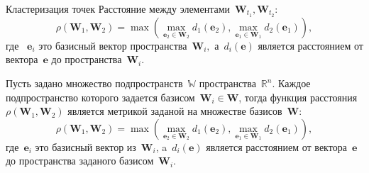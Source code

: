 \documentclass[10pt,pdf,hyperref={unicode}]{beamer}
\begin{document}
\begin{frame}[shrink=5]{Кластеризация точек}
Расстояние между элементами~$\mathbf{W}_{t_1},\mathbf{W}_{t_2}$:\\
$$\rho\left(\textbf{W}_1, \textbf{W}_2\right) = \max\left(\max_{\textbf{e}_2 \in \textbf{W}_2} d_{1}\left(\textbf{e}_2\right), \max_{\textbf{e}_1 \in \textbf{W}_1} d_{2}\left(\textbf{e}_1\right)\right),$$
где ~$\textbf{e}_i$ это базисный вектор пространства~$\textbf{W}_i,$ а~$d_i\left(\textbf{e}\right)$ является расстоянием от вектора~$\textbf{e}$ до пространства~$\textbf{W}_i$.

\begin{theorem}
Пусть задано множество подпространств~$\mathbb{W}$ пространства~$\mathbb{R}^{n}$. Каждое подпространство которого задается базисом~$\mathbf{W}_i\in \mathbf{W}$, тогда функция расстояния~$\rho\left(\textbf{W}_1, \textbf{W}_2\right)$ является метрикой заданой на множестве базисов~$\mathbf{W}$:
$$
\rho\left(\textbf{W}_1, \textbf{W}_2\right) = \max\left(\max_{\textbf{e}_2 \in \textbf{W}_2} d_{1}\left(\textbf{e}_2\right), \max_{\textbf{e}_1 \in \textbf{W}_1} d_{2}\left(\textbf{e}_1\right)\right),
$$
где~$\textbf{e}_i$ это базисный вектор из~$\textbf{W}_i$, a~$d_i\left(\textbf{e}\right)$ является расстоянием от вектора~$\textbf{e}$ до пространства заданого базисом~$\textbf{W}_i$.
\end{theorem}
\end{frame}

\end{document}
